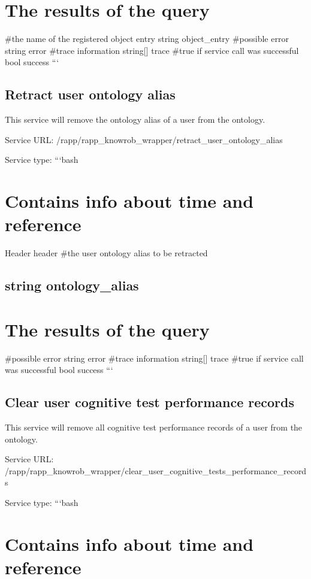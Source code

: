 \section*{The results of the query}

\#the name of the registered object entry string object\-\_\-entry \#possible error string error \#trace information string\mbox{[}\mbox{]} trace \#true if service call was successful bool success ```

\subsection*{Retract user ontology alias}

This service will remove the ontology alias of a user from the ontology.

Service U\-R\-L\-: {\ttfamily /rapp/rapp\-\_\-knowrob\-\_\-wrapper/retract\-\_\-user\-\_\-ontology\-\_\-alias}

Service type\-: ```bash \section*{Contains info about time and reference}

Header header \#the user ontology alias to be retracted \subsection*{string ontology\-\_\-alias }

\section*{The results of the query}

\#possible error string error \#trace information string\mbox{[}\mbox{]} trace \#true if service call was successful bool success ```

\subsection*{Clear user cognitive test performance records}

This service will remove all cognitive test performance records of a user from the ontology.

Service U\-R\-L\-: {\ttfamily /rapp/rapp\-\_\-knowrob\-\_\-wrapper/clear\-\_\-user\-\_\-cognitive\-\_\-tests\-\_\-performance\-\_\-records}

Service type\-: ```bash \section*{Contains info about time and reference}

